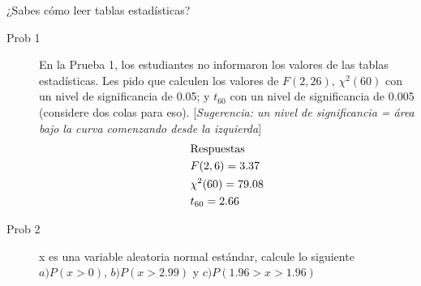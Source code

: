 \begin{frame}{¿Sabes cómo leer tablas estadísticas?}
	\begin{description}
		\item[Prob 1] En la Prueba 1, los estudiantes no informaron los valores de las tablas estadísticas. Les pido que calculen los valores de $F (2, 26)$, $\chi^2(60)$ con un nivel de significancia de 0.05; y $t_{60}$ con un nivel de significancia de 0.005 (considere dos colas para eso). [\textit{Sugerencia: un nivel de significancia = área bajo la curva comenzando desde la izquierda}]
			\begin{align*}
				&\textup{Respuestas}\\
				&F(2,6)=3.37\\
				&\chi^{2}(60)=79.08\\
				&t_{60}=2.66
			\end{align*}
		\item[Prob 2] x es una variable aleatoria normal  estándar, calcule lo siguiente $a) P (x> 0)$, $b) P (x> 2.99)$ y $c) P (1.96> x> 1.96)$
	\end{description}
\end{frame}

